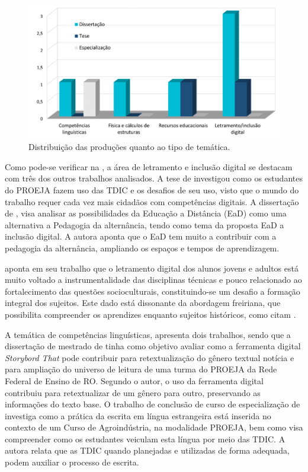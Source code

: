 \begin{figure}[!htpb]
\centering
\begin{minipage}{.5\textwidth}
\caption{Distribuição das produções quanto ao tipo de temática.}\label{fig7}
\includegraphics[width=\textwidth]{Fig7.png}
\end{minipage}
\end{figure}

Como pode-se verificar na , a área de letramento e inclusão
digital se destacam com três dos outros trabalhos analisados. A tese de
\textcite[203~f.;~il.]{Tonelli2012} investigou como os estudantes do PROEJA fazem uso
das TDIC e os desafios de seu uso, visto que o mundo do trabalho requer
cada vez mais cidadãos com competências digitais. A dissertação de \textcite[60~f]{Lobo2012}, visa analisar as possibilidades da Educação a Distância (EaD)
como uma alternativa a Pedagogia da alternância, tendo como tema da
proposta EaD a inclusão digital. A autora aponta que o EaD tem muito a
contribuir com a pedagogia da alternância, ampliando os espaços e tempos
de aprendizagem.

\textcite{rocha_os_2019} aponta em seu trabalho que o letramento digital dos alunos
jovens e adultos está muito voltado a instrumentalidade das disciplinas
técnicas e pouco relacionado ao fortalecimento das questões
socioculturais, constituindo-se um desafio a formação integral dos
sujeitos. Este dado está dissonante da abordagem freiriana, que
possibilita compreender os aprendizes enquanto sujeitos históricos, como
citam \textcite{morais2023}.

A temática de competências linguísticas, apresenta dois trabalhos, sendo
que a dissertação de mestrado de \textcite{Santos2021} tinha como objetivo
avaliar como a ferramenta digital \emph{Storybord That} pode contribuir
para retextualização do gênero textual notícia e para ampliação do
universo de leitura de uma turma do PROEJA da Rede Federal de Ensino de
RO. Segundo o autor, o uso da ferramenta digital contribuiu para
retextualizar de um gênero para outro, preservando as informações do
texto base. O trabalho de conclusão de curso de especialização de
\textcite{Silveira2021} investiga como a prática da escrita em língua
estrangeira está inserida no contexto de um Curso de Agroindústria, na
modalidade PROEJA, bem como visa compreender como os estudantes veiculam
esta língua por meio das TDIC. A autora relata que as TDIC quando
planejadas e utilizadas de forma adequada, podem auxiliar o processo de
escrita.

